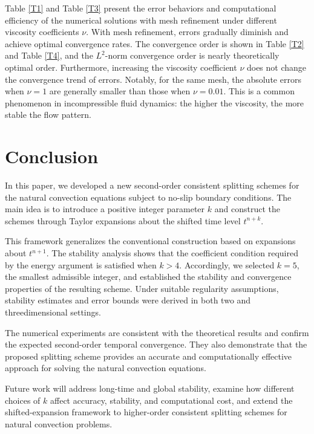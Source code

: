 \documentclass[10pt]{article}
\begin{document}
Table \ref{T1} and Table \ref{T3} present the error behaviors and computational efficiency of the numerical solutions with mesh refinement under different viscosity coefficients \(\nu\).  With mesh refinement, errors gradually diminish and achieve optimal convergence rates. The convergence order is shown in Table \ref{T2} and Table \ref{T4}, and the \(L^2\)-norm convergence order is nearly theoretically optimal order.  Furthermore, increasing the viscosity coefficient \(\nu\) does not change the convergence trend of errors. Notably, for the same mesh, the absolute errors when \(\nu=1\) are generally smaller than those when \(\nu=0.01\). This is a common phenomenon in incompressible fluid dynamics: the higher the viscosity, the more stable the flow pattern.
	
	
	
	{ 
	
	\section{Conclusion}
	
	In this paper, we developed a new  second-order consistent splitting schemes for the natural convection equations subject to no-slip boundary conditions. The main idea is to introduce a positive integer parameter \(k\) and construct the schemes through Taylor expansions about the shifted time level \(t^{n+k}\). 
	
	This framework generalizes the conventional construction based on expansions about \(t^{n+1}\). The stability analysis shows that the coefficient condition required by the energy argument is satisfied when \(k>4\). Accordingly, we selected \(k=5\), the smallest admissible integer, and established the stability and convergence properties of the resulting scheme. Under suitable regularity assumptions, stability estimates and error bounds were derived in both two and threedimensional settings.
	
	The numerical experiments are consistent with the theoretical results and confirm the expected second-order temporal convergence. They also demonstrate that the proposed splitting scheme provides an accurate and computationally effective approach for solving the natural convection equations.					
	
	Future work will address long-time and global stability, examine how different choices of \(k\) affect accuracy, stability, and computational cost, and extend the shifted-expansion framework to higher-order consistent splitting schemes for natural convection problems.
	
	
}
\end{document}
